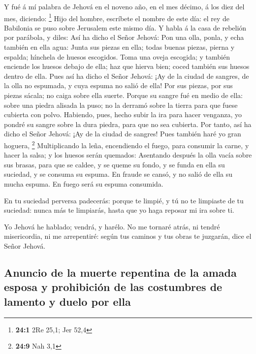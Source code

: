  Y fué á mí palabra de Jehová en el noveno año, en el mes
décimo, á los diez del mes, diciendo: \footnote{\textbf{24:1} 2Re 25,1;
  Jer 52,4}  Hijo del hombre, escríbete el nombre de este
día: el rey de Babilonia se puso sobre Jerusalem este mismo día.
 Y habla á la casa de rebelión por parábola, y diles: Así
ha dicho el Señor Jehová: Pon una olla, ponla, y echa también en ella
agua:  Junta sus piezas en ella; todas buenas piezas,
pierna y espalda; hínchela de huesos escogidos.  Toma una
oveja escogida; y también enciende los huesos debajo de ella; haz que
hierva bien; coced también sus huesos dentro de ella. 
Pues así ha dicho el Señor Jehová: ¡Ay de la ciudad de sangres, de la
olla no espumada, y cuya espuma no salió de ella! Por sus piezas, por
sus piezas sácala; no caiga sobre ella suerte.  Porque su
sangre fué en medio de ella: sobre una piedra alisada la puso; no la
derramó sobre la tierra para que fuese cubierta con polvo.
 Habiendo, pues, hecho subir la ira para hacer venganza,
yo pondré su sangre sobre la dura piedra, para que no sea cubierta.
 Por tanto, así ha dicho el Señor Jehová: ¡Ay de la ciudad
de sangres! Pues también haré yo gran hoguera, \footnote{\textbf{24:9}
  Nah 3,1}  Multiplicando la leña, encendiendo el fuego,
para consumir la carne, y hacer la salsa; y los huesos serán quemados:
 Asentando después la olla vacía sobre sus brasas, para
que se caldee, y se queme su fondo, y se funda en ella su suciedad, y se
consuma su espuma.  En fraude se cansó, y no salió de
ella su mucha espuma. En fuego será su espuma consumida.

 En tu suciedad perversa padecerás: porque te limpié, y
tú no te limpiaste de tu suciedad: nunca más te limpiarás, hasta que yo
haga reposar mi ira sobre ti.

 Yo Jehová he hablado; vendrá, y harélo. No me tornaré
atrás, ni tendré misericordia, ni me arrepentiré: según tus caminos y
tus obras te juzgarán, dice el Señor Jehová.

\hypertarget{anuncio-de-la-muerte-repentina-de-la-amada-esposa-y-prohibiciuxf3n-de-las-costumbres-de-lamento-y-duelo-por-ella}{%
\subsection{Anuncio de la muerte repentina de la amada esposa y
prohibición de las costumbres de lamento y duelo por
ella}\label{anuncio-de-la-muerte-repentina-de-la-amada-esposa-y-prohibiciuxf3n-de-las-costumbres-de-lamento-y-duelo-por-ella}}

